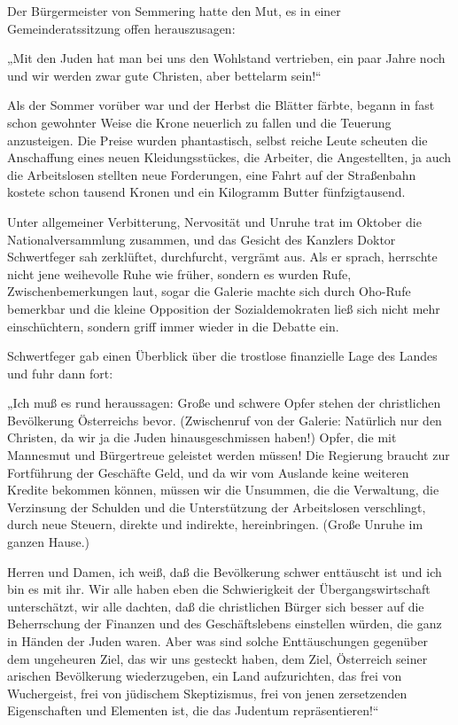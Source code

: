Der Bürgermeister von Semmering hatte den Mut, es in einer
Gemeinderatssitzung offen herauszusagen:

„Mit den Juden hat man bei uns den Wohlstand vertrieben, ein paar
Jahre noch und wir werden zwar gute Christen, aber bettelarm
sein!“

\tb{* * *}
Als der Sommer vorüber war und der Herbst die Blätter färbte,
begann in fast schon gewohnter Weise die Krone neuerlich zu fallen
und die Teuerung anzusteigen. Die Preise wurden phantastisch,
selbst reiche Leute scheuten die Anschaffung eines neuen
Kleidungsstückes, die Arbeiter, die Angestellten, ja auch die
Arbeitslosen stellten neue Forderungen, eine Fahrt auf der
Straßenbahn kostete  schon tausend Kronen und ein
Kilogramm Butter fünfzigtausend.

Unter allgemeiner Verbitterung, Nervosität und Unruhe trat im
Oktober die Nationalversammlung zusammen, und das Gesicht des
Kanzlers Doktor Schwertfeger sah zerklüftet, durchfurcht, vergrämt
aus. Als er sprach, herrschte nicht jene weihevolle Ruhe wie
früher, sondern es wurden Rufe, Zwischenbemerkungen laut, sogar die
Galerie machte sich durch Oho-Rufe bemerkbar und die kleine
Opposition der Sozialdemokraten ließ sich nicht mehr einschüchtern,
sondern griff immer wieder in die Debatte ein.

Schwertfeger gab einen Überblick über die trostlose finanzielle
Lage des Landes und fuhr dann fort:

„Ich muß es rund heraussagen: Große und schwere Opfer stehen der
christlichen Bevölkerung Österreichs bevor. (Zwischenruf von der
Galerie: Natürlich nur den Christen, da wir ja die Juden
hinausgeschmissen haben!) Opfer, die mit Mannesmut und Bürgertreue
geleistet werden müssen! Die Regierung braucht zur Fortführung der
Geschäfte Geld, und da wir vom Auslande keine weiteren Kredite
bekommen können, müssen wir die Unsummen, die die Verwaltung, die
Verzinsung der Schulden und die Unterstützung der Arbeitslosen
verschlingt, durch neue Steuern, direkte und indirekte,
hereinbringen. (Große Unruhe im ganzen Hause.)

 Herren und Damen, ich weiß, daß die
Bevölkerung schwer enttäuscht ist und ich bin es mit ihr. Wir alle
haben eben die Schwierigkeit der Übergangswirtschaft unterschätzt,
wir alle dachten, daß die christlichen  Bürger sich
besser auf die Beherrschung der Finanzen und des Geschäftslebens
einstellen würden, die ganz in Händen der Juden waren. Aber was
sind solche Enttäuschungen gegenüber dem ungeheuren Ziel, das wir
uns gesteckt haben, dem Ziel, Österreich seiner arischen
Bevölkerung wiederzugeben, ein Land aufzurichten, das frei von
Wuchergeist, frei von jüdischem Skeptizismus, frei von jenen
zersetzenden Eigenschaften und Elementen ist, die das Judentum
repräsentieren!“

